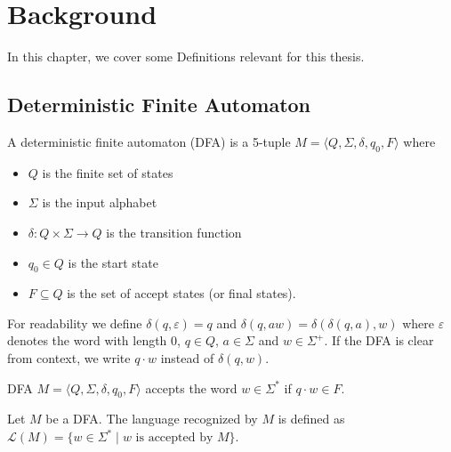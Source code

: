 \chapter{Background}

In this chapter, we cover some Definitions relevant for this thesis.

\section{Deterministic Finite Automaton}
\begin{definition}
A deterministic finite automaton (DFA) is a 5-tuple $M = \langle Q, \Sigma, \delta, q_0, F \rangle$ where
\begin{itemize}
    \item $Q$ is the finite set of states
    \item $\Sigma$ is the input alphabet
    \item $\delta : Q \times \Sigma \rightarrow Q$ is the transition function
    \item $q_0 \in Q$ is the start state
    \item $F \subseteq Q$ is the set of accept states (or final states).
\end{itemize}
For readability we define $\delta(q, \varepsilon) = q$ and $\delta(q, aw) = \delta(\delta(q, a), w)$ where $\varepsilon$ denotes the word with length 0, $q \in Q$, $a \in \Sigma$ and $w \in \Sigma^+$.
If the DFA is clear from context, we write $q \cdot w$ instead of $\delta(q, w)$.
\end{definition}

\begin{definition}
DFA $M = \langle Q, \Sigma, \delta, q_0, F \rangle$ accepts the word $w \in \Sigma^*$ if $q \cdot w \in F$.
\end{definition}

\begin{definition}
Let $M$ be a DFA. The language recognized by $M$ is defined as $\mathcal L(M) = \{w \in \Sigma^* \mid w \text{ is accepted by } M\}$.
\end{definition}


